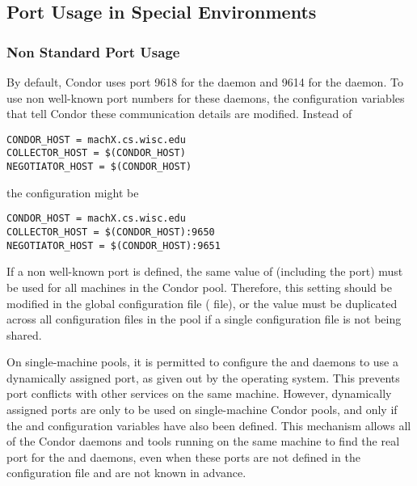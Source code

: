 \subsection{\label{sec:Port-Details}Port Usage in Special Environments }


\subsubsection{\label{sec:Ports-NonStandard}Non Standard Port Usage}
By default,
Condor uses port 9618 for the  daemon
and 9614 for the  daemon.
To use non well-known port numbers for these daemons,
the configuration variables that tell Condor these communication
details are modified.
Instead of
\begin{verbatim}
CONDOR_HOST = machX.cs.wisc.edu
COLLECTOR_HOST = $(CONDOR_HOST)
NEGOTIATOR_HOST = $(CONDOR_HOST)
\end{verbatim}
the configuration might be
\footnotesize
\begin{verbatim}
CONDOR_HOST = machX.cs.wisc.edu
COLLECTOR_HOST = $(CONDOR_HOST):9650
NEGOTIATOR_HOST = $(CONDOR_HOST):9651
\end{verbatim}
\normalsize

If a non well-known port is defined, the same value of
 (including the port) must be used for all
machines in the Condor pool.
Therefore, this setting should be modified in the global
configuration file ( file),
or the value must be duplicated across
all configuration files in the pool if a single configuration file
is not being shared.

On single-machine pools, 
it is permitted to configure the
 and  daemons
to use a dynamically assigned port,
as given out by the operating system.
This prevents port conflicts with other services on the same machine.
However, dynamically assigned ports are only to be used on
single-machine Condor pools,
and only if the
 and 
configuration variables have also been defined.
This mechanism allows all of the Condor daemons and tools running on
the same machine to find the real port for the  and
 daemons,
even when these ports are not defined in the
configuration file and are not known in advance.

